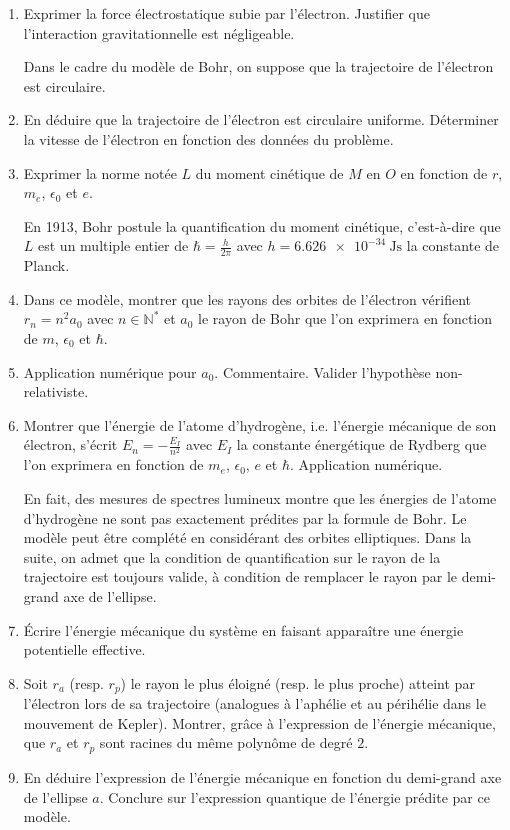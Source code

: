\begin{enumerate}
	\item Exprimer la force électrostatique subie par l'électron. Justifier que l'interaction gravitationnelle est négligeable.
	
	Dans le cadre du modèle de Bohr, on suppose que la trajectoire de l'électron est circulaire.
	
	\item En déduire que la trajectoire de l'électron est circulaire uniforme. Déterminer la vitesse de l'électron en fonction des données du problème.
	
	\item Exprimer la norme notée $L$ du moment cinétique de $M$ en $O$ en fonction de $r$, $m_e$, $\epsilon_0$ et $e$.
	
	En 1913, Bohr postule la quantification du moment cinétique, c'est-à-dire que $L$ est un multiple entier de $\hbar = \frac{h}{2\pi}$ avec $h = \SI{6.626e-34}{\joule\second}$ la constante de Planck. 
	
	\item Dans ce modèle, montrer que les rayons des orbites de l'électron vérifient $r_n = n^2 a_0$ avec $n \in \mathbb{N}^*$ et $a_0$ le rayon de Bohr que l'on exprimera en fonction de $m$, $\epsilon_0$ et $\hbar$. 
	
	\item Application numérique pour $a_0$. Commentaire. Valider l'hypothèse non-relativiste.
	
	\item Montrer que l'énergie de l'atome d'hydrogène, i.e. l'énergie mécanique de son électron, s'écrit $E_n = -\frac{E_I}{n^2}$ avec $E_I$ la constante énergétique de Rydberg que l'on exprimera en fonction de $m_e$, $\epsilon_0$, $e$ et $\hbar$. Application numérique.
	
	En fait, des mesures de spectres lumineux montre que les énergies de l'atome d'hydrogène ne sont pas exactement prédites par la formule de Bohr. Le modèle peut être complété en considérant des orbites elliptiques. Dans la suite, on admet que la condition de quantification sur le rayon de la trajectoire est toujours valide, à condition de remplacer le rayon par le demi-grand axe de l'ellipse.
	
	\item Écrire l'énergie mécanique du système en faisant apparaître une énergie potentielle effective.
	
	\item Soit $r_a$ (resp. $r_p$) le rayon le plus éloigné (resp. le plus proche) atteint par l'électron lors de sa trajectoire (analogues à l'aphélie et au périhélie dans le mouvement de Kepler). Montrer, grâce à l'expression de l'énergie mécanique, que $r_a$ et $r_p$ sont racines du même polynôme de degré $2$.
	
	\item En déduire l'expression de l'énergie mécanique en fonction du demi-grand axe de l'ellipse $a$. Conclure sur l'expression quantique de l'énergie prédite par ce modèle.
\end{enumerate}


